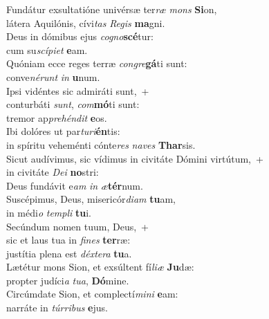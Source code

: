 \evenverse Fundátur exsultatióne univérsæ ter\textit{ræ} \textit{mons} \textbf{Si}on,~\*\\
\evenverse látera Aquilónis, cívi\textit{tas} \textit{Re}\textit{gis} \textbf{ma}gni.\\
\oddverse Deus in dómibus ejus \textit{co}\textit{gno}\textbf{scé}tur:~\*\\
\oddverse cum su\textit{scí}\textit{pi}\textit{et} \textbf{e}am.\\
\evenverse Quóniam ecce reges terræ \textit{con}\textit{gre}\textbf{gá}ti sunt:~\*\\
\evenverse conve\textit{né}\textit{runt} \textit{in} \textbf{u}num.\\
\oddverse Ipsi vidéntes sic admiráti sunt,~+\\
\oddverse  conturbáti \textit{sunt}, \textit{com}\textbf{mó}ti sunt:~\*\\
\oddverse tremor ap\textit{pre}\textit{hén}\textit{dit} \textbf{e}os.\\
\evenverse Ibi dolóres ut par\textit{tu}\textit{ri}\textbf{én}tis:~\*\\
\evenverse in spíritu veheménti cónte\textit{res} \textit{na}\textit{ves} \textbf{Thar}sis.\\
\oddverse Sicut audívimus, sic vídimus in civitáte Dómini virtútum,~+\\
\oddverse  in civitáte \textit{De}\textit{i} \textbf{no}stri:~\*\\
\oddverse Deus fundávit e\textit{am} \textit{in} \textit{æ}\textbf{tér}num.\\
\evenverse Suscépimus, Deus, misericór\textit{di}\textit{am} \textbf{tu}am,~\*\\
\evenverse in médi\textit{o} \textit{tem}\textit{pli} \textbf{tu}i.\\
\oddverse Secúndum nomen tuum, Deus,~+\\
\oddverse  sic et laus tua in \textit{fi}\textit{nes} \textbf{ter}ræ:~\*\\
\oddverse justítia plena est \textit{déx}\textit{te}\textit{ra} \textbf{tu}a.\\
\evenverse Lætétur mons Sion, et exsúltent fí\textit{li}\textit{æ} \textbf{Ju}dæ:~\*\\
\evenverse propter judíci\textit{a} \textit{tu}\textit{a}, \textbf{Dó}mine.\\
\oddverse Circúmdate Sion, et complectí\textit{mi}\textit{ni} \textbf{e}am:~\*\\
\oddverse narráte in \textit{túr}\textit{ri}\textit{bus} \textbf{e}jus.\\
